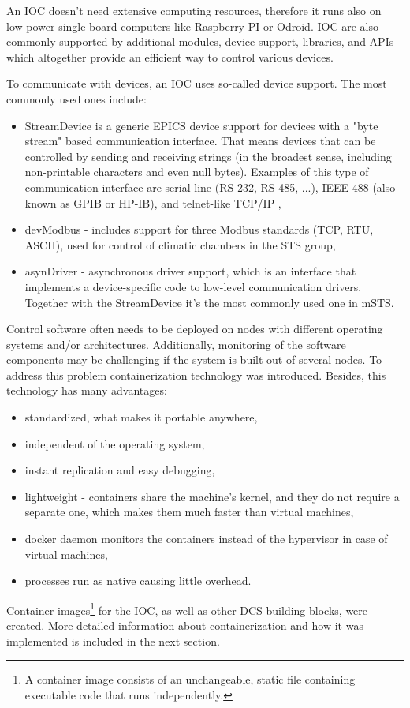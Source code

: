 An \gls{IOC} doesn't need extensive computing resources, therefore it runs also on low-power single-board computers like Raspberry PI or Odroid. 
 \gls{IOC} are also commonly supported by additional modules, device support, libraries, and \glspl{API} which altogether provide an efficient way to control various devices.

 
To communicate with devices, an \gls{IOC} uses so-called device support. The most commonly used ones include:
\begin{itemize}
    \item StreamDevice is a generic EPICS device support for devices with a "byte stream" based communication interface. That means devices that can be controlled by sending and receiving strings (in the broadest sense, including non-printable characters and even null bytes). Examples of this type of communication interface are serial line (RS-232, RS-485, ...), IEEE-488 (also known as GPIB or HP-IB), and telnet-like TCP/IP \cite{StreamDevice},
    \item devModbus \cite{modbus} - includes support for three Modbus standards (TCP, RTU, ASCII), used for control of climatic chambers in the \gls{STS} group,
    \item asynDriver \cite{asyn} - asynchronous driver support, which is an interface that implements a device-specific code to low-level communication drivers. Together with the StreamDevice it's the most commonly used one in \gls{mSTS}. 
\end{itemize}

Control software often needs to be deployed on nodes with different operating systems and/or architectures. Additionally, monitoring of the software components may be challenging if the system is built out of several nodes. To address this problem containerization technology was introduced. Besides, this technology has many advantages:
\begin{itemize}
    \item standardized, what makes it portable anywhere,
    \item independent of the operating system,
    \item instant replication and easy debugging,
    \item lightweight - containers share the machine's kernel, and they do not require a separate one, which makes them much faster than virtual machines,
    \item docker daemon monitors the containers instead of the hypervisor in case of virtual machines,
    \item processes run as native causing little overhead.
\end{itemize}

Container images\footnote{A container image consists of an unchangeable, static file containing executable code that runs independently.} for the \gls{IOC}, as well as other \gls{DCS} building blocks, were created. More detailed information about containerization and how it was implemented is included in the next section.
 
